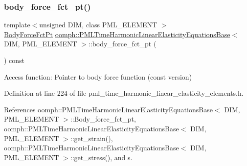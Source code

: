 \subsubsection{\texorpdfstring{body\+\_\+force\+\_\+fct\+\_\+pt()}{body\_force\_fct\_pt()}\hspace{0.1cm}{\footnotesize\ttfamily [2/2]}}
{\footnotesize\ttfamily template$<$unsigned D\+IM, class P\+M\+L\+\_\+\+E\+L\+E\+M\+E\+NT $>$ \\
\hyperlink{classoomph_1_1PMLTimeHarmonicLinearElasticityEquationsBase_a04218d2a825726c0cd6b975d1ecd2f12}{Body\+Force\+Fct\+Pt} \hyperlink{classoomph_1_1PMLTimeHarmonicLinearElasticityEquationsBase}{oomph\+::\+P\+M\+L\+Time\+Harmonic\+Linear\+Elasticity\+Equations\+Base}$<$ D\+IM, P\+M\+L\+\_\+\+E\+L\+E\+M\+E\+NT $>$\+::body\+\_\+force\+\_\+fct\+\_\+pt (\begin{DoxyParamCaption}{ }\end{DoxyParamCaption}) const\hspace{0.3cm}{\ttfamily [inline]}}



Access function\+: Pointer to body force function (const version) 



Definition at line 224 of file pml\+\_\+time\+\_\+harmonic\+\_\+linear\+\_\+elasticity\+\_\+elements.\+h.



References oomph\+::\+P\+M\+L\+Time\+Harmonic\+Linear\+Elasticity\+Equations\+Base$<$ D\+I\+M, P\+M\+L\+\_\+\+E\+L\+E\+M\+E\+N\+T $>$\+::\+Body\+\_\+force\+\_\+fct\+\_\+pt, oomph\+::\+P\+M\+L\+Time\+Harmonic\+Linear\+Elasticity\+Equations\+Base$<$ D\+I\+M, P\+M\+L\+\_\+\+E\+L\+E\+M\+E\+N\+T $>$\+::get\+\_\+strain(), oomph\+::\+P\+M\+L\+Time\+Harmonic\+Linear\+Elasticity\+Equations\+Base$<$ D\+I\+M, P\+M\+L\+\_\+\+E\+L\+E\+M\+E\+N\+T $>$\+::get\+\_\+stress(), and s.

\mbox{\label{classoomph_1_1PMLTimeHarmonicLinearElasticityEquationsBase_a5d54836b3f071ce2940d4afb835e8d34}} 
